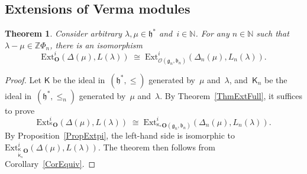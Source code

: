 \documentclass[11pt]{amsart}
\newcommand{\lbra}{[\![}
\newcommand{\rbra}{]\!]}
\newcommand{\KKK}{\mathsf{K}}
\newcommand{\rR}{\Phi}
\newcommand{\cO}{\mathcal O}
\newcommand{\bO}{\mathbf{O}}
\newcommand{\Ext}{\mathrm{Ext}}
\newcommand{\fg}{\mathfrak{g}}
\newcommand{\fh}{\mathfrak{h}}
\newcommand{\fb}{\mathfrak{b}}
\newcommand{\mN}{\mathbb{N}}
\newcommand{\mZ}{\mathbb{Z}}
\numberwithin{equation}{section}
\theoremstyle{plain}
\newtheorem{thm}[subsubsection]{Theorem}
\theoremstyle{remark}
\theoremstyle{remark}
\theoremstyle{construction}
\begin{document}



\subsection{Extensions of Verma modules}
\begin{thm}\label{ExtDL}
Consider arbitrary $\lambda,\mu\in\fh^\ast$ and~$i\in\mN$. For any $n\in\mN$ such that~$\lambda-\mu \in\mZ\rR_n$, {there is an isomorphism}
$$\Ext^i_{{\bO}}(\Delta(\mu),L(\lambda))\;\cong\; \Ext^i_{\cO(\fg_n,\fb_n)}(\Delta_n(\mu),L_n(\lambda)).$$
\end{thm}
\begin{proof}
Let $\KKK$ be the ideal in~$(\fh^\ast,\le)$ generated by~$\mu$ and~$\lambda$, and~$\KKK_n$ be the ideal in~$(\fh^\ast,\le_n)$ generated by~$\mu$ and~$\lambda$. By Theorem~\ref{ThmExtFull}, it suffices to prove 
$$\Ext^i_{{}^{\KKK}\bO}(\Delta(\mu),L(\lambda))\;\cong\; \Ext^i_{{}^{\KKK_n}\bO(\fg_n,\fb_n)}(\Delta_n(\mu),L_n(\lambda)).$$
By Proposition~\ref{PropExtpi}, the left-hand side is isomorphic to $\Ext^i_{{}^{\KKK}_{\mathring{\KKK}_n}\bO}(\Delta(\mu),L(\lambda))$. The theorem then follows from Corollary~\ref{CorEquiv}.
\end{proof}
\end{document}
